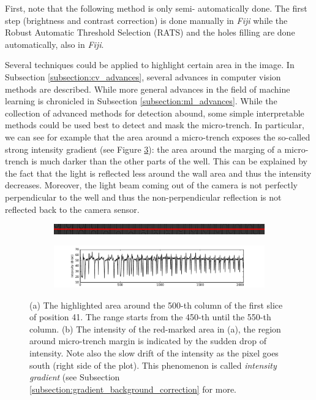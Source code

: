 \documentclass[pdftex,12pt,a4paper]{report}
\begin{document}
First, note that the following method is only semi- automatically done. The first step (brightness and contrast correction) is done manually in \textit{Fiji} while the Robust Automatic Threshold Selection (RATS) and the holes filling are done automatically, also in \textit{Fiji}.

Several techniques could be applied to highlight certain area in the image. In Subsection \ref{subsection:cv_advances}, several advances in computer vision methods are described. While more general advances in the field of machine learning is chronicled in Subsection \ref{subsection:ml_advances}. While the collection of advanced methods for detection abound, some simple interpretable methods could be used best to detect and mask the micro-trench. In particular,  we can see for example that the area around a micro-trench exposes the so-called strong intensity gradient (see Figure \ref{fig:pos41_brightness}): the area around the marging of a micro-trench is much darker than the other parts of the well. This can be explained by the fact that the light is reflected less around the wall area and thus the intensity decreases. Moreover, the light beam coming out of the camera is not perfectly perpendicular to the well and thus the non-perpendicular reflection is not reflected back to the camera sensor. 

\begin{figure}[H]
\centering

\begin{subfigure}{\textwidth}
  \centering
  \includegraphics[width=\textwidth]{images/pos_41_cut_highlight_y_500}
  \caption{}
  \label{fig:pos41_highlight}
\end{subfigure}%

\begin{subfigure}{\textwidth}
  \centering
  \includegraphics[width=\textwidth]{images/pos_41_cut_highlight_y_500_contrast}
  \caption{}
  \label{fig:pos41_contrast}
\end{subfigure}%
\caption{(a) The highlighted area around the 500-th column of the first slice of position 41. The range starts from the 450-th until the 550-th column. (b) The intensity of the red-marked area in (a), the region around micro-trench margin is indicated by the sudden drop of intensity. Note also the slow drift of the intensity as the pixel goes south (right side of the plot). This phenomenon is called \textit{intensity gradient} (see Subsection \ref{subsection:gradient_background_correction} for more.}
\label{fig:pos41_brightness}
\end{figure}
\end{document}
